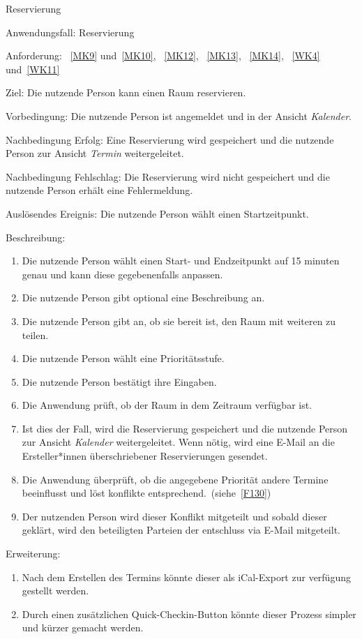 \begin{function}{40}{Reservierung}
    \item[Anwendungsfall:] Reservierung
    \item[Anforderung:]~\ref{MK9} und~\ref{MK10}, ~\ref{MK12}, ~\ref{MK13}, ~\ref{MK14}, ~\ref{WK4} und~\ref{WK11}
    \item[Ziel:] Die nutzende Person kann einen Raum reservieren.
    \item[Vorbedingung:] Die nutzende Person ist angemeldet und in der Ansicht \textit{Kalender}.
    \item[Nachbedingung Erfolg:] Eine Reservierung wird gespeichert und die nutzende Person zur Ansicht \textit{Termin} weitergeleitet.
    \item[Nachbedingung Fehlschlag:] Die Reservierung wird nicht gespeichert und die nutzende Person erhält eine Fehlermeldung.
    \item[Auslösendes Ereignis:] Die nutzende Person wählt einen Startzeitpunkt.
    \item[Beschreibung:] ~
    \begin{enumerate}
        \item Die nutzende Person wählt einen Start- und Endzeitpunkt auf 15 minuten genau und kann diese gegebenenfalls anpassen.
        \item Die nutzende Person gibt optional eine Beschreibung an.
        \item Die nutzende Person gibt an, ob sie bereit ist, den Raum mit weiteren zu teilen.
        \item Die nutzende Person wählt eine Prioritätsstufe.
        \item Die nutzende Person bestätigt ihre Eingaben.
        \item Die Anwendung prüft, ob der Raum in dem Zeitraum verfügbar ist.
        \item Ist dies der Fall, wird die Reservierung gespeichert und die nutzende Person zur Ansicht \textit{Kalender} weitergeleitet.
        Wenn nötig, wird eine E-Mail an die Ersteller*innen überschriebener Reservierungen gesendet.
        \item Die Anwendung überprüft, ob die angegebene Priorität andere Termine beeinflusst und löst konflikte entsprechend.~(siehe~\ref{F130})
        \item Der nutzenden Person wird dieser Konflikt mitgeteilt und sobald dieser geklärt, wird den beteiligten Parteien der entschluss via E-Mail mitgeteilt.
    \end{enumerate}
    \item[Erweiterung:] ~
    \begin{enumerate}
        \item Nach dem Erstellen des Termins könnte dieser als iCal-Export zur verfügung gestellt werden.
        \item Durch einen zusätzlichen Quick-Checkin-Button könnte dieser Prozess simpler und kürzer gemacht werden.
    \end{enumerate}
\end{function}

